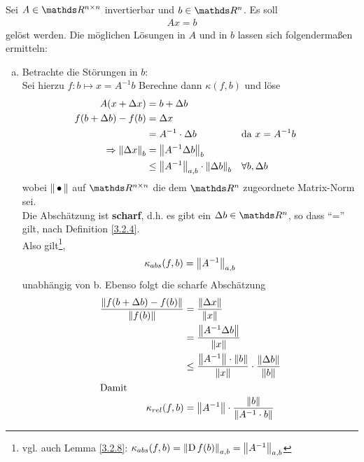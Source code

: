 \begin{Bspe}
  \label{3.2.10}
  Sei $A\in \R^{n\times n}$ invertierbar und $b\in \R^n$. Es soll 
  \begin{gather*}
    Ax =b
  \end{gather*}
  gelöst werden.
  Die möglichen Lösungen in $A$ und in $b$ lassen sich folgendermaßen ermitteln:
  \begin{enumerate}[a)]
  \item Betrachte die Störungen in $b$:\\
    Sei hierzu $f\colon b\mapsto x= A^{-1}b$
    Berechne dann $ \kappa(f,b)$ und löse 
    \begin{align*}
      A(x + \Delta x) &= b+\Delta b \\
      f(b + \Delta b) - f(b) &= \Delta x \\
                      &= A^{-1} \cdot \Delta b 
                             && \text{da }x = A^{-1}b \\
      \Rightarrow \nn[\Delta x]_{b}  &= \nn[A^{-1}\Delta b]_{b} \\
                      &\leq \nn[A^{-1}]_{a,b}\cdot \nn[\Delta b]_{b} 
                             && \forall b, \Delta b 
    \end{align*}
    wobei $\nn$ auf $\Renn$ die dem $\Ren$ zugeordnete Matrix-Norm sei. \\
    Die Abschätzung ist \textbf{scharf}, 
    d.h. es gibt ein $\Delta b\in \R^n$, so dass \enquote{=} gilt, 
    nach Definition \ref{3.2.4}. \\
    Also gilt\footnote{vgl. auch Lemma \ref{3.2.8}: 
      $\kappa_{abs}(f,b)=\nn[\D f(b)]_{a,b}=\nn[A^{-1}]_{a,b}$},
    \begin{gather}
      \kappa_{abs}(f,b) = \nn[A^{-1}]_{a,b} \label{III.2.6}
    \end{gather}
    unabhängig von b.
    Ebenso folgt die scharfe Abschätzung 
    \begin{align}
      \nonumber
      \frac{\nn[	f(b + \Delta b) - f(b)]}{\nn[f(b)]} 
      &= \frac{\nn[\Delta x]}{\nn[x]}\\ \nonumber
      &= \frac{\nn[A^{-1}\Delta b]}{\nn[x]} \\ \nonumber
      &\leq  \frac{\nn[A^{-1}]\cdot \nn[b]}{\nn[x]} 
        \cdot \frac{\nn[\Delta b]}{\nn[b]} \\
      \intertext{Damit}
      \kappa_{rel} (f,b) 
      &= \nn[A^{-1}]\cdot\frac{\nn[b]}{\nn[A^{-1}\cdot b]}
        \label{III.2.7}
    \end{align}

\end{enumerate}
\end{Bspe}
